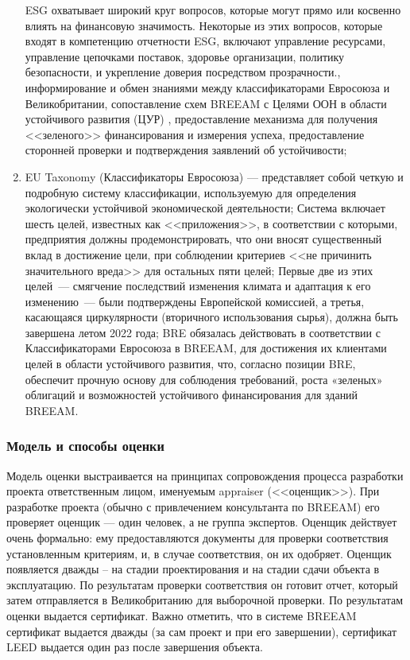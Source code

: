 \begin{enumerate}[1)]
{            ESG охватывает широкий круг вопросов, которые могут прямо или косвенно влиять на финансовую значимость.
            Некоторые из этих вопросов, которые входят в компетенцию отчетности ESG, включают управление ресурсами, управление цепочками поставок,
            здоровье организации, политику безопасности, и укрепление доверия посредством прозрачности.},
        информирование и обмен знаниями между классификаторами Евросоюза и Великобритании,
        сопоставление схем BREEAM с Целями ООН в области устойчивого развития (ЦУР) \cite{UN_17Goals},
        предоставление механизма для получения <<зеленого>> финансирования и измерения успеха,
        предоставление сторонней проверки и подтверждения заявлений об устойчивости;
    \item EU Taxonomy (Классификаторы Евросоюза) --- представляет собой четкую и подробную систему классификации, используемую для определения экологически устойчивой экономической деятельности;
        Система включает шесть целей, известных как <<приложения>>, в соответствии с которыми, предприятия должны продемонстрировать, что они вносят существенный вклад в достижение цели,
        при соблюдении критериев <<не причинить значительного вреда>> для остальных пяти целей;
        Первые две из этих целей~--- смягчение последствий изменения климата и адаптация к его изменению~--- были подтверждены Европейской комиссией,
        а третья, касающаяся циркулярности (вторичного использования сырья), должна быть завершена летом 2022 года;                                
        BRE обязалась действовать в соответствии с Классификаторами Евросоюза в BREEAM, для достижения их клиентами целей в области устойчивого развития, что, согласно позиции BRE,
            обеспечит прочную основу для соблюдения требований, роста «зеленых» облигаций и возможностей устойчивого финансирования для зданий BREEAM.
\end{enumerate}

\subsubsection*{Модель и способы оценки}
Модель оценки выстраивается на принципах сопровождения процесса разработки проекта ответственным лицом, именуемым appraiser (<<оценщик>>).
При разработке проекта (обычно с привлечением консультанта по BREEAM) его проверяет оценщик — один человек, а не группа экспертов.
Оценщик действует очень формально: ему предоставляются документы для проверки соответствия установленным критериям, и, в случае соответствия, он их одобряет.
Оценщик появляется дважды – на стадии проектирования и на стадии сдачи объекта в эксплуатацию.
По результатам проверки соответствия он готовит отчет, который затем отправляется в Великобританию для выборочной проверки. По результатам оценки выдается сертификат.
Важно отметить, что в системе BREEAM сертификат выдается дважды (за сам проект и при его завершении), сертификат LEED выдается один раз после завершения объекта.

